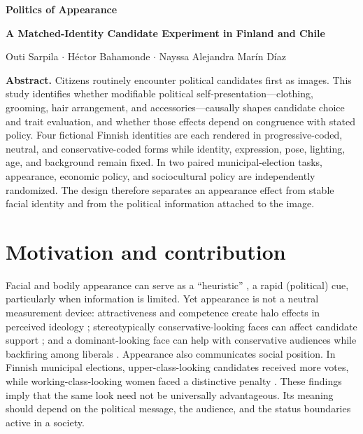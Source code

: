 \documentclass[10pt]{article}
\newcommand{\sectionbar}[1]{%
  \section*{\color{ink}#1}\vspace{-4pt}}
\newcommand{\tightcite}[1]{\citep{#1}}
\begin{document}
\begin{center}
{\LARGE\bfseries Politics of Appearance}\par
\vspace{2pt}
{\large\bfseries A Matched-Identity Candidate Experiment in Finland and Chile}\par
\vspace{5pt}
{\normalsize Outi Sarpila \quad $\cdot$ \quad H\'ector Bahamonde \quad $\cdot$ \quad Nayssa Alejandra Mar\'in D\'iaz}\par
\end{center}

\vspace{-2pt}
\begin{center}
\begin{minipage}{0.94\linewidth}
\colorbox{soft}{\parbox{0.965\linewidth}{%
\textbf{Abstract.} Citizens routinely encounter political candidates first as images. This study identifies whether modifiable political self-presentation---clothing, grooming, hair arrangement, and accessories---causally shapes candidate choice and trait evaluation, and whether those effects depend on congruence with stated policy. Four fictional Finnish identities are each rendered in progressive-coded, neutral, and conservative-coded forms while identity, expression, pose, lighting, age, and background remain fixed. In two paired municipal-election tasks, appearance, economic policy, and sociocultural policy are independently randomized. The design therefore separates an appearance effect from stable facial identity and from the political information attached to the image.}}
\end{minipage}
\end{center}

\vspace{-1pt}
\begin{center}
\end{center}
\vspace{-3pt}

\sectionbar{Motivation and contribution}
Facial and bodily appearance can serve as a ``heuristic'' \tightcite{tversky1974}, a rapid (political) cue, particularly when information is limited. Yet appearance is not a neutral measurement device: attractiveness and competence create halo effects in perceived ideology \tightcite{herrmann2016}; stereotypically conservative-looking faces can affect candidate support \tightcite{olivola2018}; and a dominant-looking face can help with conservative audiences while backfiring among liberals \tightcite{laustsen2016}. Appearance also communicates social position. In Finnish municipal elections, upper-class-looking candidates received more votes, while working-class-looking women faced a distinctive penalty \tightcite{bahamonde2024}. These findings imply that the same look need not be universally advantageous. Its meaning should depend on the political message, the audience, and the status boundaries active in a society.
\end{document}
